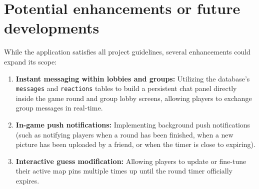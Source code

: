 \documentclass[11pt,a4paper]{article}
\begin{document}
\newpage

\section{Potential enhancements or future developments}
While the application satisfies all project guidelines, several enhancements could expand its scope:
\begin{enumerate}
    \item \textbf{Instant messaging within lobbies and groups:} Utilizing the database's \texttt{messages} and \texttt{reactions} tables to build a persistent chat panel directly inside the game round and group lobby screens, allowing players to exchange group messages in real-time.
    \item \textbf{In-game push notifications:} Implementing background push notifications (such as notifying players when a round has been finished, when a new picture has been uploaded by a friend, or when the timer is close to expiring).
    \item \textbf{Interactive guess modification:} Allowing players to update or fine-tune their active map pins multiple times up until the round timer officially expires.
\end{enumerate}
\end{document}
